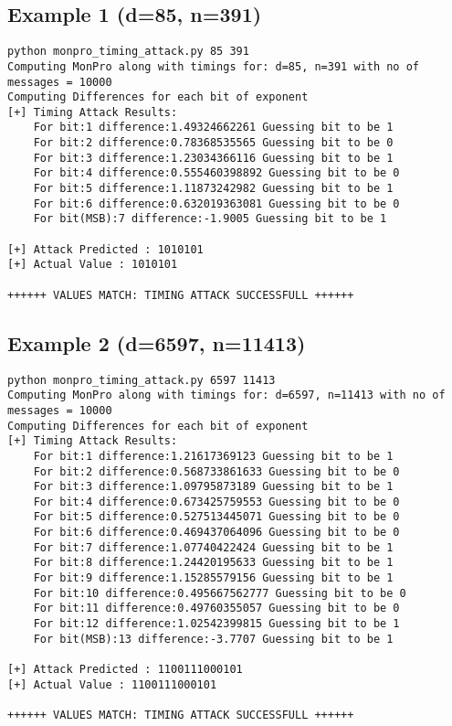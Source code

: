 \documentclass[11pt, pdftex]{article}
\begin{document}
\subsection{Example 1 (d=85, n=391)}
\begin{lstlisting}
python monpro_timing_attack.py 85 391
Computing MonPro along with timings for: d=85, n=391 with no of messages = 10000
Computing Differences for each bit of exponent
[+] Timing Attack Results:
    For bit:1 difference:1.49324662261 Guessing bit to be 1
    For bit:2 difference:0.78368535565 Guessing bit to be 0
    For bit:3 difference:1.23034366116 Guessing bit to be 1
    For bit:4 difference:0.555460398892 Guessing bit to be 0
    For bit:5 difference:1.11873242982 Guessing bit to be 1
    For bit:6 difference:0.632019363081 Guessing bit to be 0
    For bit(MSB):7 difference:-1.9005 Guessing bit to be 1

[+] Attack Predicted : 1010101
[+] Actual Value : 1010101

++++++ VALUES MATCH: TIMING ATTACK SUCCESSFULL ++++++
\end{lstlisting}
\subsection{Example 2 (d=6597, n=11413)}
\begin{lstlisting}
python monpro_timing_attack.py 6597 11413
Computing MonPro along with timings for: d=6597, n=11413 with no of messages = 10000
Computing Differences for each bit of exponent
[+] Timing Attack Results:
    For bit:1 difference:1.21617369123 Guessing bit to be 1
    For bit:2 difference:0.568733861633 Guessing bit to be 0
    For bit:3 difference:1.09795873189 Guessing bit to be 1
    For bit:4 difference:0.673425759553 Guessing bit to be 0
    For bit:5 difference:0.527513445071 Guessing bit to be 0
    For bit:6 difference:0.469437064096 Guessing bit to be 0
    For bit:7 difference:1.07740422424 Guessing bit to be 1
    For bit:8 difference:1.24420195633 Guessing bit to be 1
    For bit:9 difference:1.15285579156 Guessing bit to be 1
    For bit:10 difference:0.495667562777 Guessing bit to be 0
    For bit:11 difference:0.49760355057 Guessing bit to be 0
    For bit:12 difference:1.02542399815 Guessing bit to be 1
    For bit(MSB):13 difference:-3.7707 Guessing bit to be 1

[+] Attack Predicted : 1100111000101
[+] Actual Value : 1100111000101

++++++ VALUES MATCH: TIMING ATTACK SUCCESSFULL ++++++
\end{lstlisting}
\end{document}
